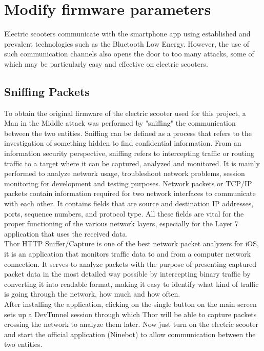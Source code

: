 \documentclass[binding=0.6cm,LaM,noexaminfo]{sapthesis}
\begin{document}
\chapter{Modify firmware parameters}
Electric scooters communicate with the smartphone app using established and prevalent technologies such as the Bluetooth Low Energy. However, the use of such communication channels also opens the door to too many attacks, some of which may be particularly easy and effective on electric scooters. 

\section{Sniffing Packets}
To obtain the original firmware of the electric scooter used for this project, a Man in the Middle attack was performed by "sniffing" the communication between the two entities. 
Sniffing can be defined as a process that refers to the investigation of something hidden to find confidential information. From an information security perspective, sniffing refers to intercepting traffic or routing traffic to a target where it can be captured, analyzed and monitored. It is mainly performed to analyze network usage, troubleshoot network problems, session monitoring for development and testing purposes.
Network packets or TCP/IP packets contain information required for two network interfaces to communicate with each other. It contains fields that are source and destination IP addresses, ports, sequence numbers, and protocol type. All these fields are vital for the proper functioning of the various network layers, especially for the Layer 7 application that uses the received data.\\
Thor HTTP Sniffer/Capture is one of the best network packet analyzers for iOS, it is an application that monitors traffic data to and from a computer network connection. It serves to analyze packets with the purpose of presenting captured packet data in the most detailed way possible by intercepting binary traffic by converting it into readable format, making it easy to identify what kind of traffic is going through the network, how much and how often.\\
After installing the application, clicking on the single button on the main screen sets up a DevTunnel session through which Thor will be able to capture packets crossing the network to analyze them later. Now just turn on the electric scooter and start the official application (Ninebot) to allow communication between the two entities.
\end{document}
